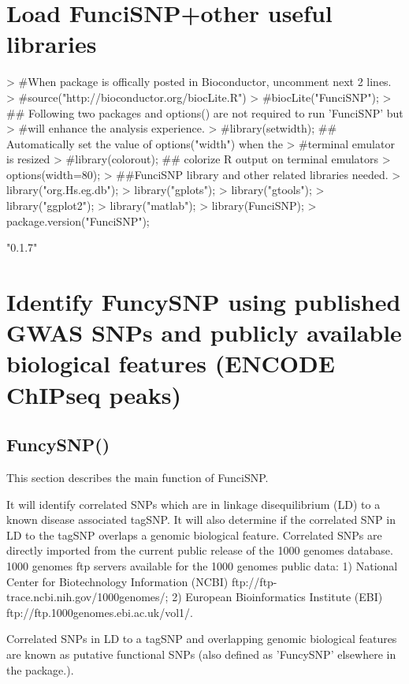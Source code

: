\documentclass[a4paper]{article}
\begin{document}
\section*{Load FunciSNP+other useful libraries}
\begin{Schunk}
\begin{Sinput}
> #When package is offically posted in Bioconductor, uncomment next 2 lines.
> #source("http://bioconductor.org/biocLite.R")
> #biocLite("FunciSNP");
> ## Following two packages and options() are not required to run 'FunciSNP' but 
> #will enhance the analysis experience.
> #library(setwidth); ## Automatically set the value of options("width") when the 
> #terminal emulator is resized
> #library(colorout); ## colorize R output on terminal emulators
> options(width=80);
> ##FunciSNP library and other related libraries needed.
> library("org.Hs.eg.db");
> library("gplots");
> library("gtools");
> library("ggplot2");
> library("matlab");
> library(FunciSNP);
> package.version("FunciSNP");
\end{Sinput}
\begin{Soutput}
[1] "0.1.7"
\end{Soutput}
\end{Schunk}

\section*{Identify FuncySNP using published GWAS SNPs and publicly available 
biological features (ENCODE ChIPseq peaks)}
\subsection*{FuncySNP()}
This section describes the main function of FunciSNP. 

It will identify correlated SNPs which are in linkage disequilibrium (LD) 
to a known disease associated tagSNP. It will also determine if the 
correlated SNP in LD to the tagSNP overlaps a genomic biological feature. 
Correlated SNPs are directly imported from the current public release of 
the 1000 genomes database. 1000 genomes ftp servers available for the 
1000 genomes public data: 1) National Center for Biotechnology Information 
(NCBI) ftp://ftp-trace.ncbi.nih.gov/1000genomes/; 2) European Bioinformatics
Institute (EBI) ftp://ftp.1000genomes.ebi.ac.uk/vol1/.

Correlated SNPs in LD to a tagSNP and overlapping genomic biological features 
are known as putative functional SNPs (also defined as 'FuncySNP' elsewhere in
 the package.).
\end{document}

